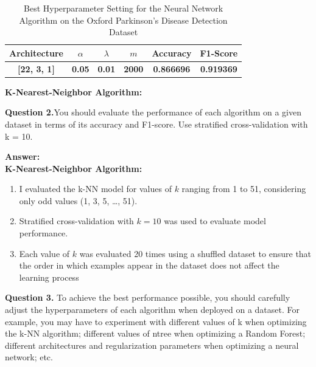 \documentclass{article}
\begin{document}
\begin{enumerate}
\begin{table}[H]
\centering
\large
\renewcommand{\arraystretch}{1.5}
\setlength{\tabcolsep}{15pt}
\begin{tabular}{|c|c|c|c|c|c|}
\hline
\textbf{Architecture} & \textbf{$\alpha$} & \textbf{$\lambda$} & \textbf{$m$} & \textbf{Accuracy} & \textbf{F1-Score} \\
\hline
\textbf{[22, 3, 1]} & \textbf{0.05} & \textbf{0.01} & \textbf{2000} & \textbf{0.866696} & \textbf{0.919369} \\
\hline
\end{tabular}
\caption{Best Hyperparameter Setting for the Neural Network Algorithm
on the Oxford Parkinson's Disease Detection Dataset}
\label{tab:nn_best_parkinsons}
\end{table}

\end{enumerate}

{\Large\textbf{K-Nearest-Neighbor Algorithm:}}\\
\vspace{0.3cm}

\noindent \textbf{Question 2.}You should evaluate the performance of each algorithm on a given dataset in terms of its accuracy and F1-score. Use stratified cross-validation with k = 10.

\vspace{0.3cm}
\noindent \textbf{Answer:}\\

\textbf{K-Nearest-Neighbor Algorithm:}
\begin{enumerate}
    \item I evaluated the k-NN model for values of $k$ ranging from 1 to 51, considering only odd values (1, 3, 5, \ldots, 51).
    \item Stratified cross-validation with $k = 10$ was used to evaluate model performance.
    \item Each value of $k$ was evaluated 20 times using a shuffled dataset to ensure that the order in which examples appear in the dataset does not affect the learning process\\
\end{enumerate}

\noindent \textbf{Question 3.} To achieve the best performance possible, you should carefully adjust the hyperparameters of each algorithm when deployed on a dataset. For example, you may have to experiment with different values of k when optimizing the k-NN algorithm; different values of ntree when optimizing a Random Forest; different architectures and regularization parameters when optimizing a neural network; etc.\\
\end{document}
